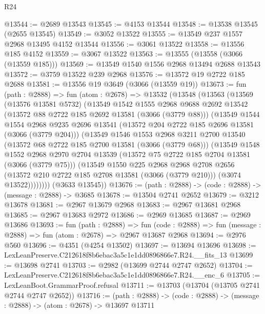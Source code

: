 \begin{lexlean}{R24}
\begin{coremodule}
@13544 := @2689 @13543
@13545 := @4153 @13544
@13548 := @13538 @13545 (@2655 @13545)
@13549 := @3052 @13522
@13555 := @13549 @237 @1557 @2968 @13495 @4152 @13544
@13556 := @3061 @13522
@13558 := @13556 @185 @4152
@13559 := @3067 @13522
@13563 := @13555 (@13558 (@3066 (@13559 @185)))
@13569 := @13549 @1540 @1556 @2968 @13494 @2688 @13543
@13572 := @3759 @13522 @239 @2968
@13576 := @13572 @19 @2722 @185 @2688
@13581 := @13556 @19 @3649 (@3066 (@13559 @19))
@13673 := fun (path : @2888) =>
  fun (atom : @2678) =>
  @13532
    (@13548
      (@13563
        (@13569
          (@13576 @13581 @5732)
          (@13549
            @1542
            @1555
            @2968
            @9688
            @2692
            @13542
            (@13572 @88 @2722 @185 @2692 @13581 (@3066 (@3779 @88)))
            (@13549
              @1544
              @1554
              @2968
              @9235
              @2696
              @13541
              (@13572 @204 @2722 @185 @2696 @13581 (@3066 (@3779 @204)))
              (@13549
                @1546
                @1553
                @2968
                @3211
                @2700
                @13540
                (@13572 @68 @2722 @185 @2700 @13581 (@3066 (@3779 @68)))
                (@13549
                  @1548
                  @1552
                  @2968
                  @2970
                  @2704
                  @13539
                  (@13572 @75 @2722 @185 @2704 @13581 (@3066 (@3779 @75)))
                  (@13549
                    @1550
                    @225
                    @2968
                    @2968
                    @2708
                    @2656
                    (@13572 @210 @2722 @185 @2708 @13581 (@3066 (@3779 @210)))
                    (@3074 @13522))))))))
      (@3633 @13545))
@13676 := (path : @2888) -> (code : @2888) -> (message : @2888) -> @3685
@13678 := @13504 @2741 @2652
@13679 := @3212 @13678
@13681 := @2967 @13679 @2968
@13683 := @2967 @13681 @2968
@13685 := @2967 @13683 @2972
@13686 := @2969 @13685
@13687 := @2969 @13686
@13693 := fun (path : @2888) =>
  fun (code : @2888) => fun (message : @2888) => fun (atom : @2678) => @2967 @13687 @2968
@13694 := @2976 @560
@13696 := @4351 (@4254 @13502)
@13697 := @13694 @13696
@13698 := LexLeanPreserve.C212618f8b6ebac3a5c1e1dd0896866e7.R24.__fits_13
@13699 := @13698 @2741
@13703 := @2982 (@13699 @2744 @2747 @2652)
@13704 := LexLeanPreserve.C212618f8b6ebac3a5c1e1dd0896866e7.R24.__enc_6
@13705 := LexLeanBoot.GrammarProof.refusal
@13711 := @13703 (@13704 (@13705 @2741 @2744 @2747 @2652))
@13716 := (path : @2888) -> (code : @2888) -> (message : @2888) -> (atom : @2678) -> @13697 @13711

\end{coremodule}
\end{lexlean}
